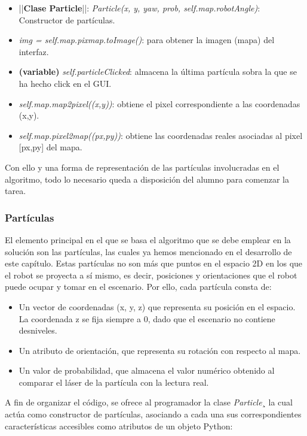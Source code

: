 \begin{itemize}
	\item ||\textbf{Clase Particle}||: \textit{Particle(x, y, yaw, prob, self.map.robotAngle)}: Constructor de partículas.
	\item \textit{img = self.map.pixmap.toImage()}: para obtener la imagen (mapa) del interfaz.
	\item \textbf{(variable)} \textit{self.particleClicked}: almacena la última partícula sobra la que se ha hecho click en el GUI. 
	\item \textit{self.map.map2pixel((x,y))}: obtiene el pixel correspondiente a las coordenadas (x,y).
	\item \textit{self.map.pixel2map((px,py))}: obtiene las coordenadas reales asociadas al pixel [px,py] del mapa.
\end{itemize}

Con ello y una forma de representación de las partículas involucradas en el algoritmo, todo lo necesario queda a disposición del alumno para comenzar la tarea. 

\subsubsection{Partículas}
El elemento principal en el que se basa el algoritmo que se debe emplear en la solución son las partículas, las cuales ya hemos mencionado en el desarrollo de este capítulo. Estas partículas no son más que puntos en el espacio 2D en los que el robot se proyecta a sí mismo, es decir, posiciones y orientaciones que el robot puede ocupar y tomar en el escenario. Por ello, cada partícula consta de:

\begin{itemize}
  \renewcommand{\labelitemi}{$\to$}
	\item Un vector de coordenadas (x, y, z) que representa su posición en el espacio. La coordenada z se fija siempre a 0, dado que el escenario no contiene desniveles.
	\item Un atributo de orientación, que representa su rotación con respecto al mapa. 
	\item Un valor de probabilidad, que almacena el valor numérico obtenido al comparar el láser de la partícula con la lectura real.
\end{itemize}

A fin de organizar el código, se ofrece al programador la clase \textit{Particle}¸ la cual actúa como constructor de partículas, asociando a cada una sus correspondientes características accesibles como atributos de un objeto Python:

